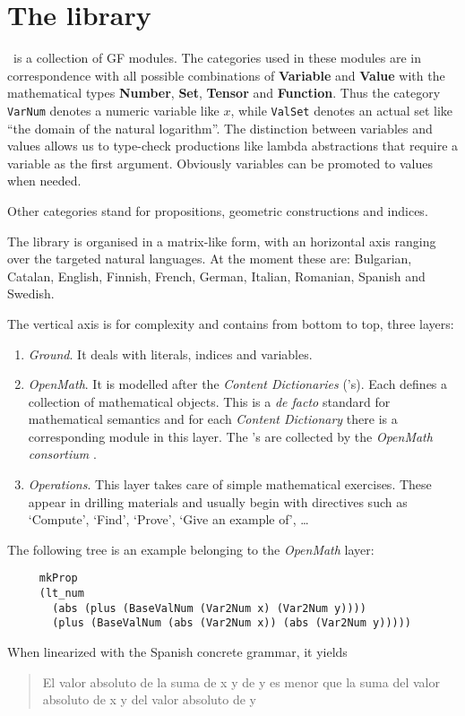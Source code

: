 \documentclass[adraft,copyright,creativecommons]{eptcs}
\begin{document}
\section{The library} %
\label{sec:the_library}

\MGL\ is a collection of GF modules. The categories used in these modules
are in correspondence with all possible combinations of \textbf{Variable}
and \textbf{Value} with the mathematical types
\textbf{Number}, \textbf{Set}, \textbf{Tensor} and \textbf{Function}.
Thus the category \texttt{VarNum} denotes a numeric
variable like $x$, while \texttt{ValSet} denotes an actual set like ``the
domain of the natural logarithm''.  The distinction between variables and
values allows us to type-check productions like lambda abstractions that
require a variable as the first argument.  Obviously variables can be
promoted to values when needed.

Other categories stand for propositions, geometric constructions and
indices.

The library is organised in a matrix-like form, with an horizontal axis
ranging over the targeted natural languages.  At the moment these are:
Bulgarian,
Catalan, English, Finnish, French, German, Italian, Romanian, Spanish and
Swedish.

The vertical axis is for complexity and contains from bottom to top, three
layers:

\begin{enumerate}
\item\emph{Ground}. It deals with literals, indices and variables.
\item\emph{OpenMath}. It is modelled after the \OM{ } \emph{Content
Dictionaries} (\CD's). Each \CD{} defines a collection of
mathematical objects. This is a \emph{de facto} standard for mathematical
semantics and for each \emph{Content Dictionary}
there is a corresponding module in this layer.
The \CD's are collected by the
\emph{OpenMath consortium} \cite{OpenMath}.
\item\emph{Operations}.
This layer takes care of simple mathematical exercises. These appear
in drilling materials and usually begin with directives such as
`Compute', `Find', `Prove', `Give an example of', \ldots
\end{enumerate}

The following tree is an example belonging to the \emph{OpenMath} layer:
\begin{lstlisting}
     mkProp
     (lt_num
       (abs (plus (BaseValNum (Var2Num x) (Var2Num y))))
       (plus (BaseValNum (abs (Var2Num x)) (abs (Var2Num y)))))
\end{lstlisting}
When linearized with the Spanish concrete grammar, it yields
\begin{quote}
El valor absoluto de la suma  de x y de y es menor que la suma del valor
absoluto  de x y del valor absoluto de y
\end{quote}
\end{document}

